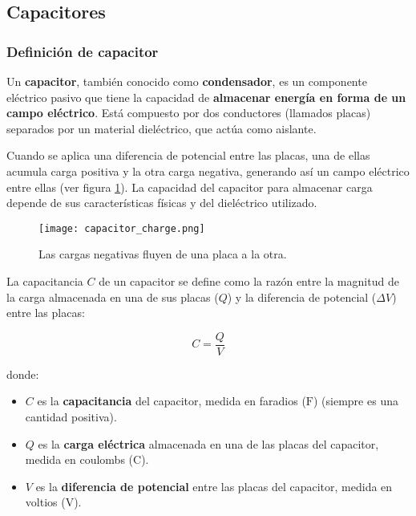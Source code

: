\subsection{Capacitores}

\subsubsection{Definición de capacitor}

Un \textbf{capacitor}, también conocido como \textbf{condensador}, es un componente eléctrico pasivo que tiene la capacidad de \textbf{almacenar energía en forma de un campo eléctrico}. Está compuesto por dos conductores (llamados placas) separados por un material dieléctrico, que actúa como aislante.

Cuando se aplica una diferencia de potencial entre las placas, una de ellas acumula carga positiva y la otra carga negativa, generando así un campo eléctrico entre ellas (ver figura \ref{fig:capacitor_charge}). La capacidad del capacitor para almacenar carga depende de sus características físicas y del dieléctrico utilizado.

\begin{figure}[ht]
    \centering
    \texttt{[image: capacitor\_charge.png]}
    \caption{Las cargas negativas fluyen de una placa a la otra.}
    \label{fig:capacitor_charge}
\end{figure}

La capacitancia \( C \) de un capacitor se define como la razón entre la magnitud de la carga almacenada en una de sus placas (\( Q \)) y la diferencia de potencial (\( \Delta V \)) entre las placas:

\begin{equation}
    C = \frac{Q}{V}
    \label{eq:capacitance}    
\end{equation}

donde:

\begin{itemize}
    \item \( C \) es la \textbf{capacitancia} del capacitor, medida en faradios (\(\si{\farad}\)) (siempre es una cantidad positiva).
    \item \( Q \) es la \textbf{carga eléctrica} almacenada en una de las placas del capacitor, medida en coulombs (\(\si{\coulomb}\)).
    \item \( V \) es la \textbf{diferencia de potencial} entre las placas del capacitor, medida en voltios (\(\si{\volt}\)).
\end{itemize}

